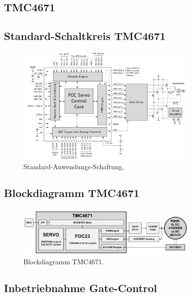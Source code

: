 \begin{appendix} 

\section{TMC4671}\label{Appendix:TMC4671}

\subsection{Standard-Schaltkreis TMC4671}

\begin{figure}[h!]
	\centering
	\includegraphics[width=0.8\textwidth]{graphics/Standard_Application_Cirquit_TMC4671}
	\caption{Standard-Anwendungs-Schaltung.}
	\label{fig:Schaltung_TMC4671}
\end{figure}

\subsection{Blockdiagramm TMC4671}

\begin{figure}[h!]
	\centering
	\includegraphics[width=0.8\textwidth]{graphics/Blockdiagramm_TMC4671}
	\caption{Blockdiagramm TMC4671.}
	\label{fig:Blockdiagramm_TMC4671}
\end{figure}

\newpage

\subsection{Inbetriebnahme Gate-Control}


\end{appendix}
